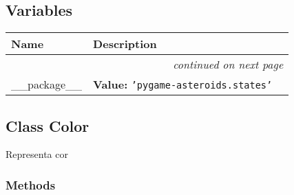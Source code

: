   \subsection{Variables}

    \vspace{-1cm}
\hspace{\varindent}\begin{longtable}{|p{\varnamewidth}|p{\vardescrwidth}|l}
\cline{1-2}
\cline{1-2} \centering \textbf{Name} & \centering \textbf{Description}& \\
\cline{1-2}
\endhead\cline{1-2}\multicolumn{3}{r}{\small\textit{continued on next page}}\\\endfoot\cline{1-2}
\endlastfoot\raggedright \_\-\_\-p\-a\-c\-k\-a\-g\-e\-\_\-\_\- & \raggedright \textbf{Value:} 
{\tt \texttt{'}\texttt{pygame-asteroids.states}\texttt{'}}&\\
\cline{1-2}
\end{longtable}



\subsection{Class Color}

    \label{color:Color}
Representa cor



  \subsubsection{Methods}

    \label{color:Color:color_replace}

    \vspace{0.5ex}

